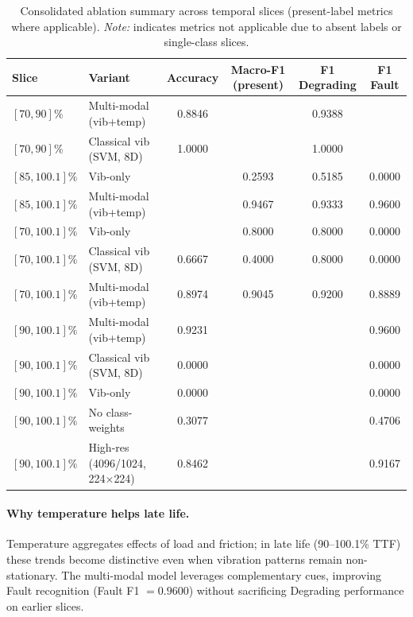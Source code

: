 \documentclass[pdflatex,sn-mathphys-num]{sn-jnl}%
\begin{document}
\begin{table}[t]
  \caption{Consolidated ablation summary across temporal slices (present-label metrics where applicable). \emph{Note:} \textemdash{} indicates metrics not applicable due to absent labels or single-class slices.}
  \label{tab:abl_summary}
  \centering
  \begin{tabular}{l l c c c c}
    \toprule
    Slice & Variant & Accuracy & Macro-F1 (present) & F1 Degrading & F1 Fault \\
    \midrule
    $[70,90]\%$ & Multi-modal (vib+temp) & 0.8846 & \textemdash{} & 0.9388 & \textemdash{} \\
    $[70,90]\%$ & Classical vib (SVM, 8D) & 1.0000 & \textemdash{} & 1.0000 & \textemdash{} \\
    $[85,100.1]\%$ & Vib-only &  & 0.2593 & 0.5185 & 0.0000 \\
    $[85,100.1]\%$ & Multi-modal (vib+temp) &  & 0.9467 & 0.9333 & 0.9600 \\
    \midrule
    $[70,100.1]\%$ & Vib-only &  & 0.8000 & 0.8000 & 0.0000 \\
    $[70,100.1]\%$ & Classical vib (SVM, 8D) & 0.6667 & 0.4000 & 0.8000 & 0.0000 \\
    $[70,100.1]\%$ & Multi-modal (vib+temp) & 0.8974 & 0.9045 & 0.9200 & 0.8889 \\
    \midrule
    $[90,100.1]\%$ & Multi-modal (vib+temp) & 0.9231 & \textemdash{} & \textemdash{} & 0.9600 \\
    $[90,100.1]\%$ & Classical vib (SVM, 8D) & 0.0000 & \textemdash{} & \textemdash{} & 0.0000 \\
    $[90,100.1]\%$ & Vib-only & 0.0000 & \textemdash{} & \textemdash{} & 0.0000 \\
    $[90,100.1]\%$ & No class-weights & 0.3077 & \textemdash{} & \textemdash{} & 0.4706 \\
    $[90,100.1]\%$ & High-res (4096/1024, 224$\times$224) & 0.8462 & \textemdash{} & \textemdash{} & 0.9167 \\
    \bottomrule
  \end{tabular}
\end{table}

\paragraph{Why temperature helps late life.}
Temperature aggregates effects of load and friction; in late life (90--100.1\% TTF) these trends become distinctive even when vibration patterns remain non-stationary. The multi-modal model leverages complementary cues, improving Fault recognition (Fault F1 $=0.9600$) without sacrificing Degrading performance on earlier slices.
\end{document}
